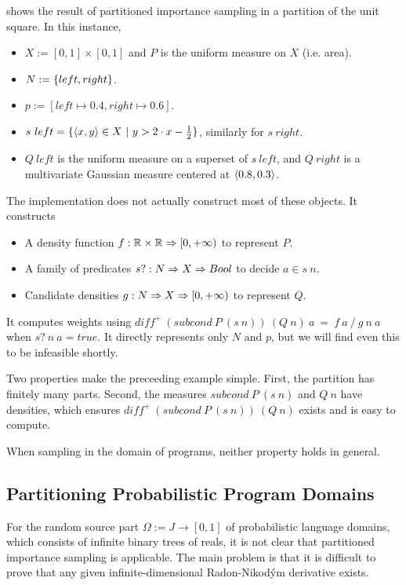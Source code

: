 \begin{example}
 shows the result of partitioned importance sampling in a partition of the unit square.
In this instance,
\begin{itemize}
	\item $X := [0,1] \times [0,1]$ and $P$ is the uniform measure on $X$ (i.e. area).
	\item $N := \{{left,right}\}$.
	\item $p := [left \mapsto 0.4, right \mapsto 0.6]$.
	\item $s~left = \lbrace {\langle{x,y}\rangle \in X} \ \lvert\ {y > 2 \cdot x - \frac{1}{2}} \rbrace$, similarly for $s~right$.
	\item $Q~left$ is the uniform measure on a superset of $s~left$, and $Q~right$ is a multivariate Gaussian measure centered at $\langle{0.8,0.3}\rangle$.
\end{itemize}
The implementation does not actually construct most of these objects. It constructs
\begin{itemize}
	\item A density function $f : \mathbb{R} \times \mathbb{R} \Rightarrow [0,+\infty)$ to represent $P$.
	\item A family of predicates $s? : N \Rightarrow X \Rightarrow Bool$ to decide $a \in s~n$.
	\item Candidate densities $g : N \Rightarrow X \Rightarrow [0,+\infty)$ to represent $Q$.
\end{itemize}
It computes weights using $diff^+~(subcond~P~(s~n))~(Q~n)~a\ =\ f~a~{/}~g~n~a$ when $s?~n~a = true$.
It directly represents only $N$ and $p$, but we will find even this to be infeasible shortly.
\exampleqed
\end{example}

Two properties make the preceeding example simple.
First, the partition has finitely many parts.
Second, the measures $subcond~P~(s~n)$ and $Q~n$ have densities, which ensures $diff^+~(subcond~P~(s~n))~(Q~n)$ exists and is easy to compute.

When sampling in the domain of programs, neither property holds in general.

\subsection{Partitioning Probabilistic Program Domains}

For the random source part $\Omega := J \to [0,1]$ of probabilistic language domains, which consists of infinite binary trees of reals, it is not clear that partitioned importance sampling is applicable.
The main problem is that it is difficult to prove that any given infinite-dimensional Radon-Nikod\'ym derivative exists.

